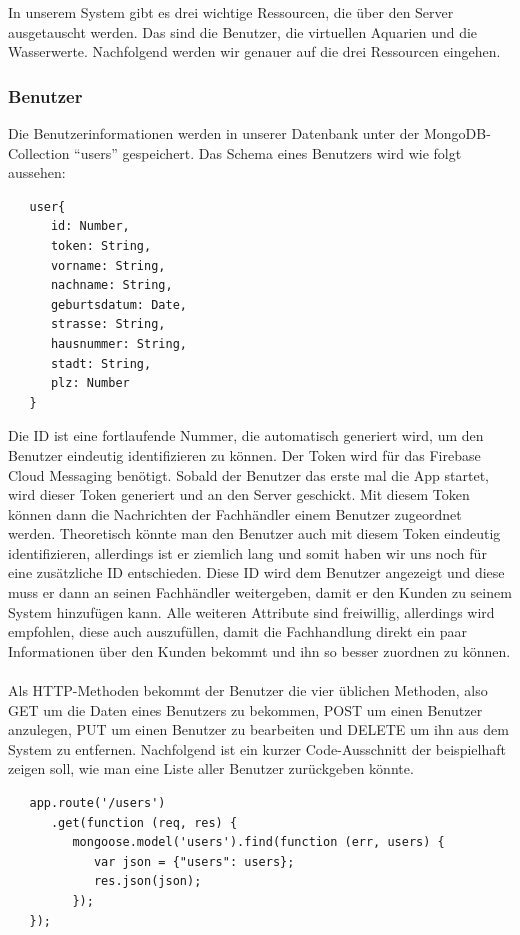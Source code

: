 In unserem System gibt es drei wichtige Ressourcen, die über den Server ausgetauscht werden. Das sind die Benutzer, die virtuellen Aquarien und die Wasserwerte. Nachfolgend werden wir genauer auf die drei Ressourcen eingehen.

\subsubsection{Benutzer}

Die Benutzerinformationen werden in unserer Datenbank unter der MongoDB-Collection ``users'' gespeichert. Das Schema eines Benutzers wird wie folgt aussehen:

\begin{lstlisting}
   user{
      id: Number,
      token: String,
      vorname: String,
      nachname: String,
      geburtsdatum: Date,
      strasse: String,
      hausnummer: String,
      stadt: String,
      plz: Number
   }
\end{lstlisting}
 
Die ID ist eine fortlaufende Nummer, die automatisch generiert wird, um den Benutzer eindeutig identifizieren zu können. Der Token wird für das Firebase Cloud Messaging benötigt. Sobald der Benutzer das erste mal die App startet, wird dieser Token generiert und an den Server geschickt. Mit diesem Token können dann die Nachrichten der Fachhändler einem Benutzer zugeordnet werden. Theoretisch könnte man den Benutzer auch mit diesem Token eindeutig identifizieren, allerdings ist er ziemlich lang und somit haben wir uns noch für eine zusätzliche ID entschieden. Diese ID wird dem Benutzer angezeigt und diese muss er dann an seinen Fachhändler weitergeben, damit er den Kunden zu seinem System hinzufügen kann. Alle weiteren Attribute sind freiwillig, allerdings wird empfohlen, diese auch auszufüllen, damit die Fachhandlung direkt ein paar Informationen über den Kunden bekommt und ihn so besser zuordnen zu können.
\\ \\
Als HTTP-Methoden bekommt der Benutzer die vier üblichen Methoden, also GET um die Daten eines Benutzers zu bekommen, POST um einen Benutzer anzulegen, PUT um einen Benutzer zu bearbeiten und DELETE um ihn aus dem System zu entfernen. Nachfolgend ist ein kurzer Code-Ausschnitt der beispielhaft zeigen soll, wie man eine Liste aller Benutzer zurückgeben könnte.

\begin{lstlisting}
   app.route('/users')
      .get(function (req, res) {
         mongoose.model('users').find(function (err, users) {
            var json = {"users": users};
            res.json(json);
         });
   });
\end{lstlisting}

